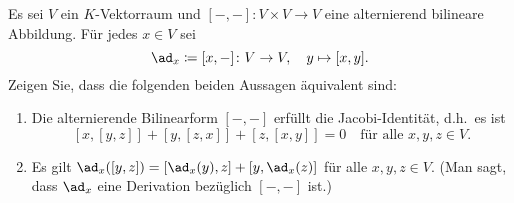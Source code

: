 \documentclass[a4paper, 10pt]{scrartcl}
\begin{document}
\begin{question}
  Es sei $V$ ein $K$-Vektorraum und $[-,-] \colon V \times V \to V$ eine alternierend bilineare Abbildung.
  Für jedes $x \in V$ sei
  \[
    \ad_x \coloneqq [x,-] \colon V \to V, \quad y \mapsto [x,y].
  \]
  Zeigen Sie, dass die folgenden beiden Aussagen äquivalent sind:
  \begin{enumerate}
    \item
      Die alternierende Bilinearform $[-,-]$ erfüllt die Jacobi-Identität, d.h.\ es ist
      \[
        [x,[y,z]] + [y,[z,x]] + [z,[x,y]] = 0
        \quad
        \text{für alle $x, y, z \in V$}.
      \]
    \item
      Es gilt $\ad_x([y,z]) = [\ad_x(y), z] + [y, \ad_x(z)]$ für alle $x, y, z \in V$.
      (Man sagt, dass $\ad_x$ eine Derivation bezüglich $[-,-]$ ist.)
  \end{enumerate}
\end{question}






\newpage


\printsolutions
\end{document}
